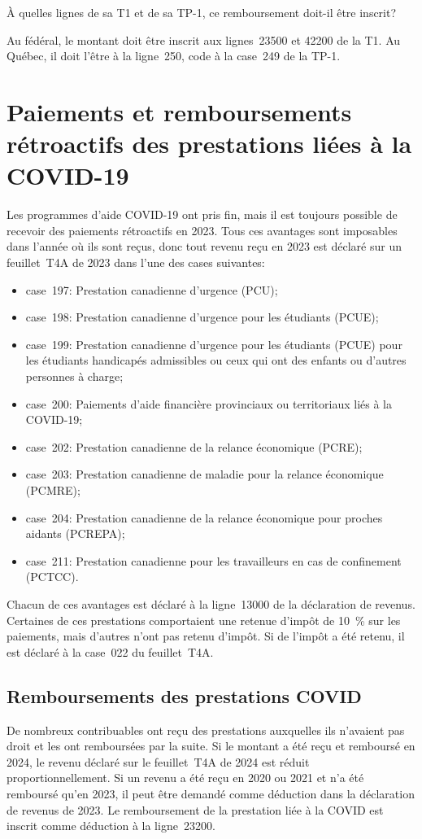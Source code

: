 \begin{sousQuestion}
	À quelles lignes de sa T1 et de sa TP-1, ce remboursement doit-il être inscrit? 
\end{sousQuestion}
Au fédéral, le montant doit être inscrit aux lignes~23500 et 42200 de la T1. Au Québec, il doit l'être à la ligne~250, code \fg{} à la case~249 de la TP-1.



\section{Paiements et remboursements rétroactifs des prestations liées à la COVID-19}
Les programmes d'aide COVID-19 ont pris fin, mais il est toujours possible de recevoir des paiements rétroactifs en 2023. Tous ces avantages sont imposables dans l'année où ils sont reçus, donc tout revenu reçu en 2023 est déclaré sur un feuillet~T4A de 2023 dans l'une des cases suivantes:
\begin{itemize}
	\item case~197: Prestation canadienne d'urgence (PCU);
	\item case~198: Prestation canadienne d'urgence pour les étudiants (PCUE);
	\item case~199: Prestation canadienne d'urgence pour les étudiants (PCUE) pour les étudiants handicapés admissibles ou ceux qui ont des enfants ou d'autres personnes à charge;
	\item case~200: Paiements d'aide financière provinciaux ou territoriaux liés à la COVID-19;
	\item case~202: Prestation canadienne de la relance économique (PCRE);
	\item case~203: Prestation canadienne de maladie pour la relance économique (PCMRE);
	\item case~204: Prestation canadienne de la relance économique pour proches aidants (PCREPA);
	\item case~211: Prestation canadienne pour les travailleurs en cas de confinement (PCTCC).
\end{itemize}

Chacun de ces avantages est déclaré à la ligne~13000 de la déclaration de revenus. Certaines de ces prestations comportaient une retenue d'impôt de 10~\% sur les paiements, mais d'autres n'ont pas retenu d'impôt. Si de l'impôt a été retenu, il est déclaré à la case~022 du feuillet~T4A. 


\subsection{Remboursements des prestations COVID}
De nombreux contribuables ont reçu des prestations auxquelles ils n'avaient pas droit et les ont remboursées par la suite. Si le montant a été reçu et remboursé en 2024, le revenu déclaré sur le feuillet~T4A de 2024 est réduit proportionnellement. Si un revenu a été reçu en 2020 ou 2021 et n'a été remboursé qu'en 2023, il peut être demandé comme déduction dans la déclaration de revenus de 2023. Le remboursement de la prestation liée à la COVID est inscrit comme déduction à la ligne~23200.

